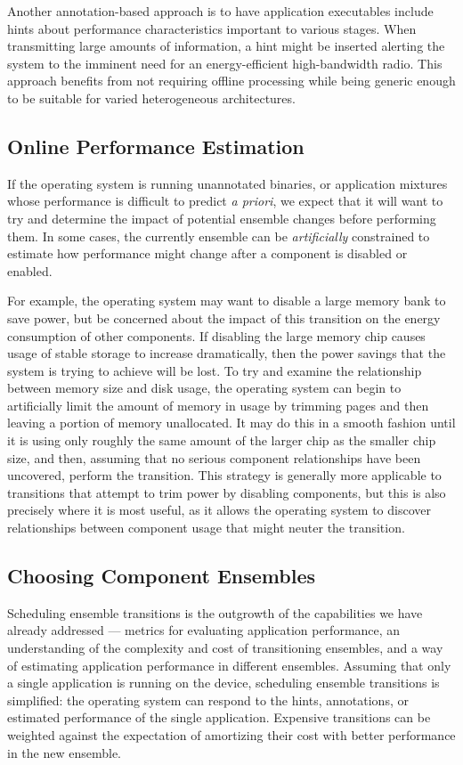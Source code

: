 Another annotation-based approach is to have application executables include
hints about performance characteristics important to various stages. When
transmitting large amounts of information, a hint might be inserted alerting
the system to the imminent need for an energy-efficient high-bandwidth radio.
This approach benefits from not requiring offline processing while being
generic enough to be suitable for varied heterogeneous architectures.

\subsection{Online Performance Estimation}

If the operating system is running unannotated binaries, or application
mixtures whose performance is difficult to predict \textit{a priori}, we
expect that it will want to try and determine the impact of potential
ensemble changes before performing them. In some cases, the currently
ensemble can be \textit{artificially} constrained to estimate how performance
might change after a component is disabled or enabled.

For example, the operating system may want to disable a large memory bank to
save power, but be concerned about the impact of this transition on the
energy consumption of other components. If disabling the large memory chip
causes usage of stable storage to increase dramatically, then the power
savings that the system is trying to achieve will be lost. To try and examine
the relationship between memory size and disk usage, the operating system can
begin to artificially limit the amount of memory in usage by trimming pages
and then leaving a portion of memory unallocated. It may do this in a smooth
fashion until it is using only roughly the same amount of the larger chip as
the smaller chip size, and then, assuming that no serious component
relationships have been uncovered, perform the transition. This strategy is
generally more applicable to transitions that attempt to trim power by
disabling components, but this is also precisely where it is most useful, as
it allows the operating system to discover relationships between component
usage that might neuter the transition.

\subsection{Choosing Component Ensembles}

Scheduling ensemble transitions is the outgrowth of the capabilities we have
already addressed --- metrics for evaluating application performance, an
understanding of the complexity and cost of transitioning ensembles, and a
way of estimating application performance in different ensembles. Assuming
that only a single application is running on the device, scheduling ensemble
transitions is simplified: the operating system can respond to the hints,
annotations, or estimated performance of the single application. Expensive
transitions can be weighted against the expectation of amortizing their cost
with better performance in the new ensemble.

